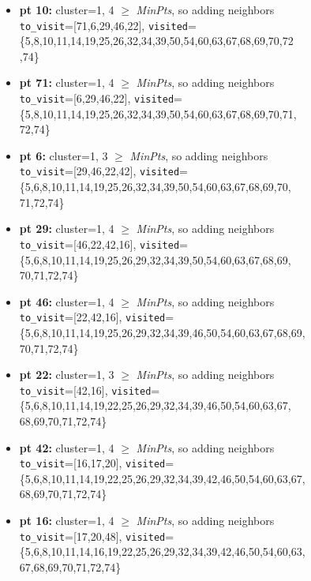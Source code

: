 \documentclass[11pt]{article}
\begin{document}
\begin{itemize}[label=$\star$]
\begin{itemize}[label=$\cdot$]
				\item \textbf{pt 10:} cluster=1, 4 $\ge$ \textit{MinPts}, so adding neighbors \\ \texttt{to\_visit}=[71,6,29,46,22], \texttt{visited}=\{5,8,10,11,14,19,25,26,32,34,39,50,54,60,63,67,68,69,70,72\\,74\}
				\item \textbf{pt 71:} cluster=1, 4 $\ge$ \textit{MinPts}, so adding neighbors \\ \texttt{to\_visit}=[6,29,46,22], \texttt{visited}=\{5,8,10,11,14,19,25,26,32,34,39,50,54,60,63,67,68,69,70,71,\\72,74\}
				\item \textbf{pt 6:} cluster=1, 3 $\ge$ \textit{MinPts}, so adding neighbors \\ \texttt{to\_visit}=[29,46,22,42], \texttt{visited}=\{5,6,8,10,11,14,19,25,26,32,34,39,50,54,60,63,67,68,69,70,\\71,72,74\}
				\item \textbf{pt 29:} cluster=1, 4 $\ge$ \textit{MinPts}, so adding neighbors \\ \texttt{to\_visit}=[46,22,42,16], \texttt{visited}=\{5,6,8,10,11,14,19,25,26,29,32,34,39,50,54,60,63,67,68,69,\\70,71,72,74\}
				\item \textbf{pt 46:} cluster=1, 4 $\ge$ \textit{MinPts}, so adding neighbors \\ \texttt{to\_visit}=[22,42,16], \texttt{visited}=\{5,6,8,10,11,14,19,25,26,29,32,34,39,46,50,54,60,63,67,68,69,\\70,71,72,74\}
				\item \textbf{pt 22:} cluster=1, 3 $\ge$ \textit{MinPts}, so adding neighbors \\ \texttt{to\_visit}=[42,16], \texttt{visited}=\{5,6,8,10,11,14,19,22,25,26,29,32,34,39,46,50,54,60,63,67,\\68,69,70,71,72,74\}
				\item \textbf{pt 42:} cluster=1, 4 $\ge$ \textit{MinPts}, so adding neighbors \\ \texttt{to\_visit}=[16,17,20], \texttt{visited}=\{5,6,8,10,11,14,19,22,25,26,29,32,34,39,42,46,50,54,60,63,67,\\68,69,70,71,72,74\}
				\item \textbf{pt 16:} cluster=1, 4 $\ge$ \textit{MinPts}, so adding neighbors \\ \texttt{to\_visit}=[17,20,48], \texttt{visited}=\{5,6,8,10,11,14,16,19,22,25,26,29,32,34,39,42,46,50,54,60,63,\\67,68,69,70,71,72,74\}

\end{itemize}
\end{itemize}
\end{document}

